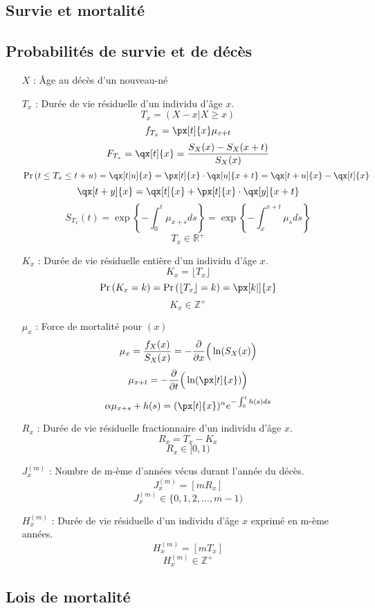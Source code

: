 \documentclass[10pt, french]{article}
\begin{document}
\begin{multicols*}{3}
\section{Survie et mortalité}
\setcounter{subsection}{1}
\subsection{Probabilités de survie et de décès}
\begin{itemize}
\item[$X$ : ] Âge au décès d'un nouveau-né
\item[$T_x$ : ] Durée de vie résiduelle d'un individu d'âge $x$.
\[T_x = (X-x | X \geq x) \]
\[ f_{T_x} = \px[t]{x} \mu_{x+t} \]
\[ F_{T_x}   =\qx[t]{x} = \frac{S_X(x) - S_X(x+t)}{S_X(x)}  \]
\[ \prob{t \leq T_x \leq t+u} = \qx[t|u]{x} = \px[t]{x} \cdot \qx[u]{x+t} = \qx[t + u]{x} - \qx[t]{x} \]
\[ \qx[t + y]{x} = \qx[t]{x} + \px[t]{x} \cdot \qx[y]{x + t}\]
\[S_{T_x}(t) = \exp \left\{ - \int_{0}^{t} \mu_{x+s} ds \right\} = \exp \left\{ - \int_{x}^{x + t} \mu_{s} ds \right\}  \]
\[T_x \in \mathbb{R}^+ \]

\item[$K_x$ : ] Durée de vie résiduelle entière d'un individu d'âge $x$.
\[K_x = \lfloor T_x \rfloor \]
\[\prob{K_x = k} = \prob{\lfloor T_x \rfloor = k} = \px[k|]{x} \]
\[K_x \in \mathbb{Z}^+ \]

\item[$\mu_x$ : ] Force de mortalité pour $(x)$
\[\mu_x = \frac{f_X(x)}{S_X(x)} = -\frac{\partial}{\partial x} \Big( \ln(S_X(x)\Big) \]
\[\mu_{x+t} = - \derivee{t} \Big( \ln ( \px[t]{x}) \Big) \]
\[\alpha\mu_{x+s} + h(s) = (\px[t]{x})^\alpha e^{-\int_{0}^{t}h(s)ds } \]


\item[$R_x$ : ] Durée de vie résiduelle fractionnaire d'un individu d'âge $x$.
\[R_x = T_x - K_x\]
\[R_x \in [0, 1) \]

\item[$J^{(m)}_x$ : ] Nombre de m-ème d'années vécus durant l'année du décès.
\[J^{(m)}_x= [m R_x] \]
\[J^{(m)}_x \in \{0, 1, 2, \dots, m - 1) \]

\item[$H^{(m)}_x$ : ] Durée de vie résiduelle d'un individu d'âge $x$ exprimé en m-ème années.
\[H^{(m)}_x= [m T_x] \]
\[H^{(m)}_x \in \mathbb{Z}^+ \]


\end{itemize}

\subsection{Lois de mortalité}

\end{multicols*}
\end{document}
